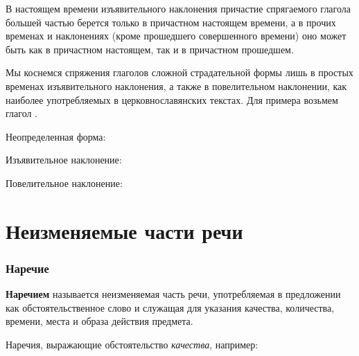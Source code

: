 \documentclass[11pt,a4paper,oneside]{memoir}
\begin{document}
    В настоящем времени изъявительного наклонения причастие спрягаемого глагола большей частью берется только в причастном настоящем времени, а в прочих временах и наклонениях (кроме прошедшего совершенного времени) оно может быть как в причастном настоящем, так и в причастном прошедшем.
    
    Мы коснемся спряжения глаголов сложной страдательной формы лишь в простых временах изъявительного наклонения, а также в повелительном наклонении, как наиболее употребляемых в церковнославянских текстах. Для примера возьмем глагол {}.
    
    \bigskip
    Неопределенная форма:
    
    \bigskip{}

    Изъявительное наклонение:

    \bigskip{}
    
    Повелительное наклонение:

    \bigskip{}

        \section{Неизменяемые части речи}
                \subsubsection{Наречие}

    \textbf{Наречием} называется неизменяемая часть речи, употребляемая в предложении как обстоятельственное слово и служащая для указания качества, количества, времени, места и образа действия предмета.
    
    Наречия, выражающие обстоятельство \emph{качества}, например:

    \bigskip{}
\end{document}
